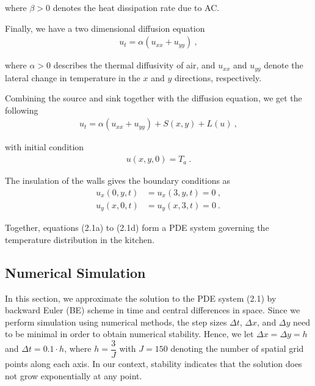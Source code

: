 \documentclass{article}
\begin{document}
\noindent where $\beta > 0$ denotes the heat dissipation rate due to AC. 

\vspace{3mm}

\noindent Finally, we have a two dimensional diffusion equation 
\begin{align*}
    u_t = \alpha(u_{xx} + u_{yy}) \ ,
\end{align*}

\noindent where $\alpha>0$ describes the thermal diffusivity of air, and $u_{xx}$ and $u_{yy}$ denote the lateral change in temperature in the $x$ and $y$ directions, respectively.

\vspace{3mm}

\noindent Combining the source and sink together with the diffusion equation, we get the following 
\begin{align*}
    u_t = \alpha(u_{xx} + u_{yy}) + S(x, y) + L(u) \ , \tag{2.1a}
\end{align*}

\noindent with initial condition 
\begin{align*}
    u(x, y, 0) = T_a \ .\tag{2.1b}
\end{align*}

\noindent The insulation of the walls gives the boundary conditions as 
\begin{align*}
    u_x(0, y, t) &= u_x(3, y, t) = 0 \ , \tag{2.1c} \\ 
    u_y(x, 0, t) &= u_y(x, 3, t) = 0 \ . \tag{2.1d}
\end{align*}

\noindent Together, equations (2.1a) to (2.1d) form a PDE system governing the temperature distribution in the kitchen.

\subsection{Numerical Simulation}
\noindent In this section, we approximate the solution to the PDE system (2.1) by backward Euler (BE) scheme in time and central differences in space. Since we perform simulation using numerical methods, the step sizes $\Delta t$, $\Delta x$, and $\Delta y$ need to be minimal in order to obtain numerical stability. Hence, we let $\Delta x = \Delta y = h$ and $\Delta t = 0.1 \cdot h$, where $h = \dfrac{3}{J}$ with $J = 150$ denoting the number of spatial grid points along each axis. In our context, stability indicates that the solution does not grow exponentially at any point.
\end{document}
